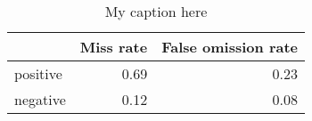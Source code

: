 \begin{table}[!ht]
\centering
\begin{tabular}{lrr}
\toprule
{} &  Miss rate &  False omission rate \\
\midrule
positive &       0.69 &                 0.23 \\
negative &       0.12 &                 0.08 \\
\bottomrule
\end{tabular}
\caption{My caption here}
\label{tab:POLARITY-ocd-combined-errors}
\end{table}